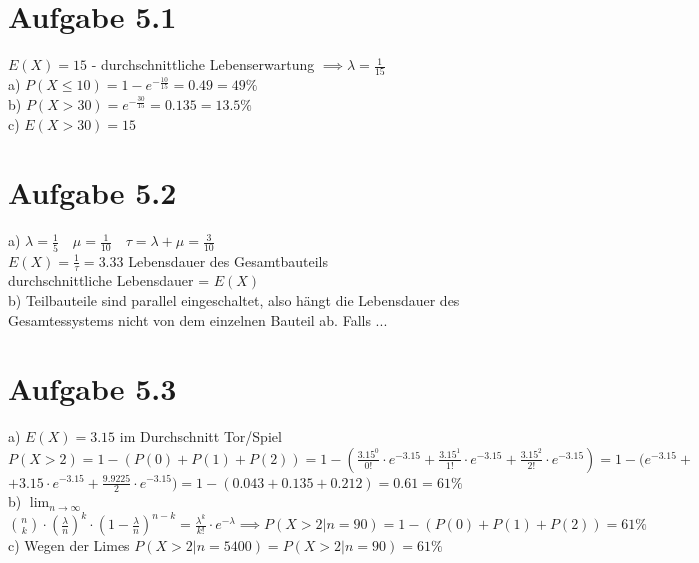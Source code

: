 \documentclass{article}
\begin{document}
	\section*{Aufgabe 5.1}
		$E(X)=15$ - durchschnittliche Lebenserwartung $\implies \lambda=\frac{1}{15}$ \\
		\newline
		a) $P(X \leq 10) = 1  - e^{-\frac{10}{15}} = 0.49 = 49\%$ \\
		\newline
		b) $P(X > 30) = e^{-\frac{30}{15}} = 0.135 = 13.5\%$ \\
		\newline
		c) $E(X > 30) = 15 $ \\
	\section*{Aufgabe 5.2}
		a) $\lambda=\frac{1}{5} \quad \mu=\frac{1}{10} \quad \tau = \lambda + \mu = \frac{3}{10}$ \\
		\newline
		$E(X)= \frac{1}{\tau} = 3.33$ Lebensdauer des Gesamtbauteils  \\
		\newline
		durchschnittliche Lebensdauer = $E(X)$ \\
		\newline
		b) Teilbauteile sind parallel eingeschaltet, also hängt die Lebensdauer des Gesamtessystems nicht von dem einzelnen Bauteil ab. Falls ...
	\section*{Aufgabe 5.3}
		a) $E(X)=3.15$ im Durchschnitt Tor/Spiel \\
		\newline
		$P(X > 2) = 1 - (P(0) + P(1) + P(2)) = 1 - (\frac{3.15^0}{0!}\cdot e^{-3.15} + \frac{3.15^1}{1!}\cdot e^{-3.15} + \frac{3.15^2}{2!}\cdot e^{-3.15}) = 1 - (e^{-3.15} + $ \\
		\newline
		$+ 3.15 \cdot e^{-3.15} + \frac{9.9225}{2}\cdot e^{-3.15}) = 1 - (0.043 + 0.135 + 0.212) = 0.61 = 61\%$ \\
		\newline 
		b) $\lim_{n\to\infty}$$\binom{n}{k} \cdot (\frac{\lambda}{n})^k\cdot(1 - \frac{\lambda}{n})^{n-k} = \frac{\lambda^k}{k!}\cdot e^{-\lambda} \implies P(X > 2 | n=90) = 1 - (P(0) + P(1) + P(2)) = 61\%$ \\
		\newline
		c) Wegen der Limes  $P(X > 2|n=5400) = P(X > 2 | n=90) = 61\%$
		
\end{document}
